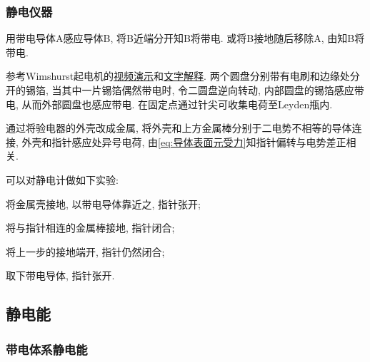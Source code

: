 \documentclass[../Electromagnetism.tex]{subfiles}
\begin{document}

\subsubsection{静电仪器} %
\label{ssub:静电仪器}

\begin{ex}
	用带电导体A感应导体B, 将B近端分开知B将带电. 或将B接地随后移除A, 由知B将带电.
\end{ex}
\begin{ex}
	参考Wimshurst起电机的\href{https://www.youtube.com/watch?v=Zilvl9tS0Og}{视频演示}和\href{http://phy.tw/\%E7\%A7\%91\%E5\%AD\%B8\%E5\%AF\%A6\%E9\%A9\%97/item/211-item-title}{文字解释}. 两个圆盘分别带有电刷和边缘处分开的锡箔, 当其中一片锡箔偶然带电时, 令二圆盘逆向转动, 内部圆盘的锡箔感应带电, 从而外部圆盘也感应带电. 在固定点通过针尖可收集电荷至Leyden瓶内.
\end{ex}
\begin{ex}
	通过将验电器的外壳改成金属, 将外壳和上方金属棒分别于二电势不相等的导体连接, 外壳和指针感应处异号电荷, 由\eqref{eq:导体表面元受力}知指针偏转与电势差正相关.
\end{ex}
\begin{ex}
	可以对静电计做如下实验:
	\begin{cenum}
		\item 将金属壳接地, 以带电导体靠近之, 指针张开;
		\item 将与指针相连的金属棒接地, 指针闭合;
		\item 将上一步的接地端开, 指针仍然闭合;
		\item 取下带电导体, 指针张开.
	\end{cenum}
\end{ex}



\subsection{静电能} %
\label{sub:静电能}

\subsubsection{带电体系静电能} %
\label{ssub:带电体系静电能}
\end{document}
